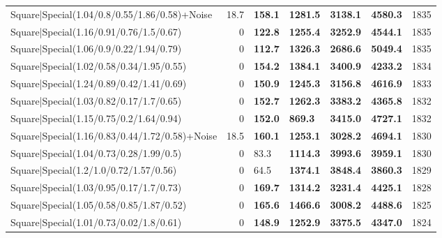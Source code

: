 \begin{tabular}{lrllllr}
 Square|Special(1.04/0.8/0.55/1.86/0.58)+Noise                 &            18.7 & \textbf{158.1} & \textbf{1281.5} & \textbf{3138.1} & \textbf{4580.3} &         1835 \\
 Square|Special(1.16/0.91/0.76/1.5/0.67)                       &             0   & \textbf{122.8} & \textbf{1255.4} & \textbf{3252.9} & \textbf{4544.1} &         1835 \\
 Square|Special(1.06/0.9/0.22/1.94/0.79)                       &             0   & \textbf{112.7} & \textbf{1326.3} & \textbf{2686.6} & \textbf{5049.4} &         1835 \\
 Square|Special(1.02/0.58/0.34/1.95/0.55)                      &             0   & \textbf{154.2} & \textbf{1384.1} & \textbf{3400.9} & \textbf{4233.2} &         1834 \\
 Square|Special(1.24/0.89/0.42/1.41/0.69)                      &             0   & \textbf{150.9} & \textbf{1245.3} & \textbf{3156.8} & \textbf{4616.9} &         1833 \\
 Square|Special(1.03/0.82/0.17/1.7/0.65)                       &             0   & \textbf{152.7} & \textbf{1262.3} & \textbf{3383.2} & \textbf{4365.8} &         1832 \\
 Square|Special(1.15/0.75/0.2/1.64/0.94)                       &             0   & \textbf{152.0} & \textbf{869.3}  & \textbf{3415.0} & \textbf{4727.1} &         1832 \\
 Square|Special(1.16/0.83/0.44/1.72/0.58)+Noise                &            18.5 & \textbf{160.1} & \textbf{1253.1} & \textbf{3028.2} & \textbf{4694.1} &         1830 \\
 Square|Special(1.04/0.73/0.28/1.99/0.5)                       &             0   & 83.3           & \textbf{1114.3} & \textbf{3993.6} & \textbf{3959.1} &         1830 \\
 Square|Special(1.2/1.0/0.72/1.57/0.56)                        &             0   & 64.5           & \textbf{1374.1} & \textbf{3848.4} & \textbf{3860.3} &         1829 \\
 Square|Special(1.03/0.95/0.17/1.7/0.73)                       &             0   & \textbf{169.7} & \textbf{1314.2} & \textbf{3231.4} & \textbf{4425.1} &         1828 \\
 Square|Special(1.05/0.58/0.85/1.87/0.52)                      &             0   & \textbf{165.6} & \textbf{1466.6} & \textbf{3008.2} & \textbf{4488.6} &         1825 \\
 Square|Special(1.01/0.73/0.02/1.8/0.61)                       &             0   & \textbf{148.9} & \textbf{1252.9} & \textbf{3375.5} & \textbf{4347.0} &         1824 \\

\end{tabular}
